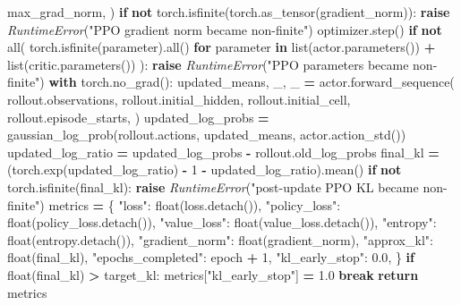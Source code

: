 \documentclass[
  american,
  11pt,
  letterpaper,
]{article}
\newenvironment{Shaded}{\begin{snugshade}}{\end{snugshade}}
\newcommand{\BuiltInTok}[1]{#1}
\newcommand{\ControlFlowTok}[1]{\textcolor[rgb]{0.13,0.29,0.53}{\textbf{#1}}}
\newcommand{\DecValTok}[1]{\textcolor[rgb]{0.00,0.00,0.81}{#1}}
\newcommand{\FloatTok}[1]{\textcolor[rgb]{0.00,0.00,0.81}{#1}}
\newcommand{\KeywordTok}[1]{\textcolor[rgb]{0.13,0.29,0.53}{\textbf{#1}}}
\newcommand{\NormalTok}[1]{#1}
\newcommand{\OperatorTok}[1]{\textcolor[rgb]{0.81,0.36,0.00}{\textbf{#1}}}
\newcommand{\PreprocessorTok}[1]{\textcolor[rgb]{0.56,0.35,0.01}{\textit{#1}}}
\newcommand{\StringTok}[1]{\textcolor[rgb]{0.31,0.60,0.02}{#1}}
\renewenvironment{Shaded}{\par\smallskip}{\par\smallskip}
\begin{document}
\begin{Shaded}
\begin{Highlighting}[]
\NormalTok{            max\_grad\_norm,}
\NormalTok{        )}
        \ControlFlowTok{if} \KeywordTok{not}\NormalTok{ torch.isfinite(torch.as\_tensor(gradient\_norm)):}
            \ControlFlowTok{raise} \PreprocessorTok{RuntimeError}\NormalTok{(}\StringTok{"PPO gradient norm became non{-}finite"}\NormalTok{)}
\NormalTok{        optimizer.step()}
        \ControlFlowTok{if} \KeywordTok{not} \BuiltInTok{all}\NormalTok{(}
\NormalTok{            torch.isfinite(parameter).}\BuiltInTok{all}\NormalTok{()}
            \ControlFlowTok{for}\NormalTok{ parameter }\KeywordTok{in} \BuiltInTok{list}\NormalTok{(actor.parameters()) }\OperatorTok{+} \BuiltInTok{list}\NormalTok{(critic.parameters())}
\NormalTok{        ):}
            \ControlFlowTok{raise} \PreprocessorTok{RuntimeError}\NormalTok{(}\StringTok{"PPO parameters became non{-}finite"}\NormalTok{)}
        \ControlFlowTok{with}\NormalTok{ torch.no\_grad():}
\NormalTok{            updated\_means, \_, \_ }\OperatorTok{=}\NormalTok{ actor.forward\_sequence(}
\NormalTok{                rollout.observations, rollout.initial\_hidden, rollout.initial\_cell,}
\NormalTok{                rollout.episode\_starts,}
\NormalTok{            )}
\NormalTok{            updated\_log\_probs }\OperatorTok{=}\NormalTok{ gaussian\_log\_prob(rollout.actions, updated\_means, actor.action\_std())}
\NormalTok{            updated\_log\_ratio }\OperatorTok{=}\NormalTok{ updated\_log\_probs }\OperatorTok{{-}}\NormalTok{ rollout.old\_log\_probs}
\NormalTok{            final\_kl }\OperatorTok{=}\NormalTok{ (torch.exp(updated\_log\_ratio) }\OperatorTok{{-}} \DecValTok{1} \OperatorTok{{-}}\NormalTok{ updated\_log\_ratio).mean()}
        \ControlFlowTok{if} \KeywordTok{not}\NormalTok{ torch.isfinite(final\_kl):}
            \ControlFlowTok{raise} \PreprocessorTok{RuntimeError}\NormalTok{(}\StringTok{"post{-}update PPO KL became non{-}finite"}\NormalTok{)}
\NormalTok{        metrics }\OperatorTok{=}\NormalTok{ \{}
            \StringTok{"loss"}\NormalTok{: }\BuiltInTok{float}\NormalTok{(loss.detach()),}
            \StringTok{"policy\_loss"}\NormalTok{: }\BuiltInTok{float}\NormalTok{(policy\_loss.detach()),}
            \StringTok{"value\_loss"}\NormalTok{: }\BuiltInTok{float}\NormalTok{(value\_loss.detach()),}
            \StringTok{"entropy"}\NormalTok{: }\BuiltInTok{float}\NormalTok{(entropy.detach()),}
            \StringTok{"gradient\_norm"}\NormalTok{: }\BuiltInTok{float}\NormalTok{(gradient\_norm),}
            \StringTok{"approx\_kl"}\NormalTok{: }\BuiltInTok{float}\NormalTok{(final\_kl),}
            \StringTok{"epochs\_completed"}\NormalTok{: epoch }\OperatorTok{+} \DecValTok{1}\NormalTok{,}
            \StringTok{"kl\_early\_stop"}\NormalTok{: }\FloatTok{0.0}\NormalTok{,}
\NormalTok{        \}}
        \ControlFlowTok{if} \BuiltInTok{float}\NormalTok{(final\_kl) }\OperatorTok{\textgreater{}}\NormalTok{ target\_kl:}
\NormalTok{            metrics[}\StringTok{"kl\_early\_stop"}\NormalTok{] }\OperatorTok{=} \FloatTok{1.0}
            \ControlFlowTok{break}
    \ControlFlowTok{return}\NormalTok{ metrics}



\end{Highlighting}
\end{Shaded}
\end{document}
